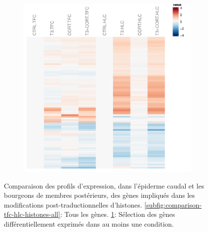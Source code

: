 \begin{figure}[!htbp]
\begin{subfigure}{0.495\textwidth}
	\includegraphics[width=\textwidth]
	{Figures/comparison-tfc-hlc-histones/comparison-tfc-hlc-histones-de.pdf}
	\caption{}
	\label{subfig:comparison-tfc-hlc-histones-de}
\end{subfigure}
\caption[Profils d'expression des gènes impliqués dans la modification d'histones]
{
Comparaison des profils d'expression, dans l'épiderme caudal et les bourgeons de membres postérieurs, des gènes impliqués dans les modifications post-traductionnelles d'histones.
\ref{subfig:comparison-tfc-hlc-histones-all}: Tous les gènes.
\ref{subfig:comparison-tfc-hlc-histones-de}: Sélection des gènes différentiellement exprimés dans au moins une condition.
}
\label{fig:comparison-tfc-hlc-histones}
%
\end{figure}
%
